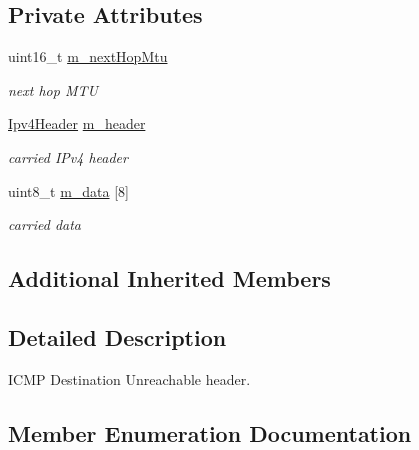 \subsection*{Private Attributes}
\begin{DoxyCompactItemize}
\item 
uint16\+\_\+t \hyperlink{classns3_1_1Icmpv4DestinationUnreachable_a2619d7ba764eab941ee90343cd4f8395}{m\+\_\+next\+Hop\+Mtu}
\begin{DoxyCompactList}\small\item\em next hop M\+TU \end{DoxyCompactList}\item 
\hyperlink{classns3_1_1Ipv4Header}{Ipv4\+Header} \hyperlink{classns3_1_1Icmpv4DestinationUnreachable_a0cb91f22d5d2eada96abf2a9a9a31999}{m\+\_\+header}
\begin{DoxyCompactList}\small\item\em carried I\+Pv4 header \end{DoxyCompactList}\item 
uint8\+\_\+t \hyperlink{classns3_1_1Icmpv4DestinationUnreachable_ae80e076547ebaa5141f1ea58db478981}{m\+\_\+data} \mbox{[}8\mbox{]}
\begin{DoxyCompactList}\small\item\em carried data \end{DoxyCompactList}\end{DoxyCompactItemize}
\subsection*{Additional Inherited Members}


\subsection{Detailed Description}
I\+C\+MP Destination Unreachable header. 

\subsection{Member Enumeration Documentation}

